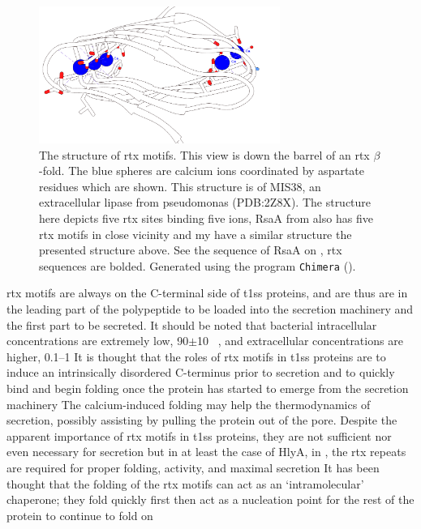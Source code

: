   \begin{figure}[htb]
    \begin{center}
      \includegraphics[width=0.7\textwidth]{intro/img/rtx-white.png}
    \end{center}
    \caption[The structure of \ac{rtx} motifs]{The structure of \ac{rtx} motifs. This view is down the barrel of an \ac{rtx} $\beta$-fold. The blue spheres are calcium ions
coordinated by aspartate residues which are shown. This structure is of MIS38, an extracellular lipase from \ac{pseudomonas} (PDB:2Z8X). The structure here depicts five \ac{rtx}
sites binding five  ions, RsaA from \caulobacter also has five \ac{rtx} motifs in close vicinity and my have a similar structure the presented structure above. See the
sequence of RsaA on , \ac{rtx} sequences are bolded. Generated using the program \texttt{Chimera} (). }
    \label{fig:intro-rtx}
  \end{figure}

  \ac{rtx} motifs are always on the C-terminal side of \ac{t1ss} proteins, and are thus are in the leading part of the polypeptide to be loaded into the secretion machinery and the
first part to be secreted. It should be noted that bacterial intracellular  concentrations are extremely low, 90$\pm$10 \si{\nano\molar}, and extracellular 
concentrations are higher, 0.1--1 \millimolar{} It is thought that the roles of \ac{rtx} motifs in \ac{t1ss} proteins are to
induce an intrinsically disordered C-terminus prior to secretion and to quickly bind  and begin folding once the protein has started to emerge from the secretion
machinery The calcium-induced folding may help the thermodynamics of secretion, possibly assisting by pulling the
protein out of the pore. Despite the apparent importance of \ac{rtx} motifs in \ac{t1ss} proteins, they are not sufficient nor even necessary for
secretion but in at least the case of HlyA, in \ecoli, the \ac{rtx} repeats are required for proper folding, activity, and maximal
secretion It has been thought that the folding of the \ac{rtx} motifs can act as an `intramolecular' chaperone; they fold quickly first then act
as a nucleation point for the rest of the protein to continue to fold on
 
